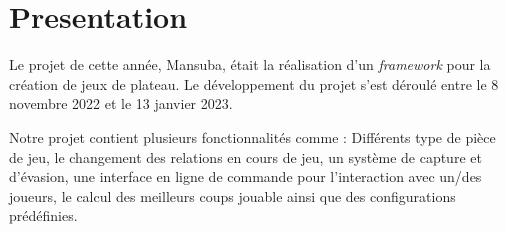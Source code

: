 \section{Presentation}

Le projet de cette année, Mansuba, était la réalisation d'un \emph{framework} pour la création de jeux de plateau.
Le développement du projet s'est déroulé entre le 8 novembre 2022 et le 13 janvier 2023. 

Notre projet contient plusieurs fonctionnalités comme : Différents type de pièce de jeu, le changement des relations en cours de jeu, 
un système de capture et d'évasion, une interface en ligne de commande pour l'interaction avec un/des joueurs, le calcul des meilleurs
coups jouable ainsi que des configurations prédéfinies.

